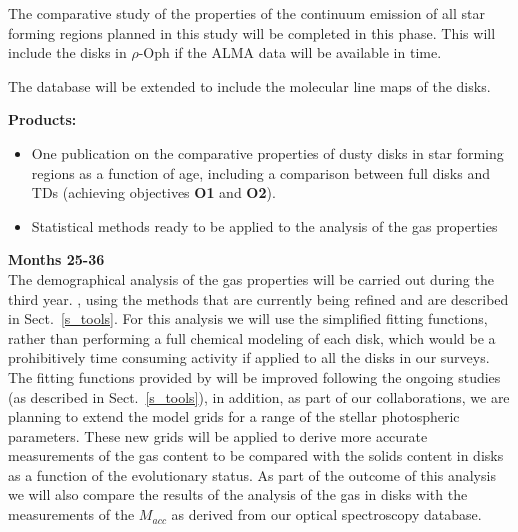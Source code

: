 \documentclass[10pt,fleqn,twoside]{article}
\begin{document}
The comparative study of the properties of the continuum emission of all star forming regions planned in this study will be completed in this phase. This will include the disks in $\rho$-Oph if the ALMA data will be available in time. 

The database will be extended to include the molecular line maps of the disks.
 
\smallskip
{\bf Products:} 
\begin{itemize}
\item One publication on the comparative properties of dusty disks in star forming regions as a function of age, including a comparison between full disks and TDs (achieving objectives {\bf O1} and {\bf O2}).
\item Statistical methods ready to be applied to the analysis of the gas properties
\end{itemize}

{\Tcol\bf Months 25-36}\\

The demographical analysis of the gas properties will be carried out during the third year. , using the methods that are currently being refined and are described in Sect.~\ref{s_tools}. For this analysis we will use the simplified fitting functions, rather than performing a full chemical modeling of each disk, which would be a prohibitively time consuming activity if applied to all the disks in our surveys. The fitting functions provided by \citet{2016A&A...594A..85M} will be improved following the ongoing studies (as described in Sect.~\ref{s_tools}), in addition, as part of our collaborations, we are planning to extend the model grids for a range of the stellar photospheric parameters. These new grids will be applied to derive more accurate measurements of the gas content to be compared with the solids content in disks as a function of the evolutionary status. As part of the outcome of this analysis we will also compare the results of the 
analysis of the gas in disks with the measurements of the $M_{acc}$ as derived from our optical spectroscopy database.
\end{document}
